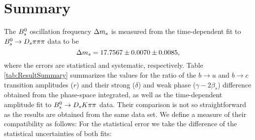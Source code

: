 \section{Summary}
\label{sec:Summary}


The ${{B}^0_{s}}$ oscillation frequency ${\Delta m_{{s}}}$ is measured from the time-dependent fit to ${{B}^0_{s}}\rightarrow{\ensuremath{{D}_{s}}}{\ensuremath{\pi}}{\ensuremath{\pi}}{\ensuremath{\pi}}$ data to be
\begin{equation*}
{\ensuremath{\Delta m_{{s}}}} = 17.7567 \pm 0.0070 \pm 0.0085,  
\end{equation*}
where the errors are statistical and systematic, respectively.
Table \ref{tab:ResultSummary} summarizes the values for the ratio of the $b\to u$ and $b\to c$ transition amplitudes ($r$)
and their strong ($\delta$) and weak phase ($\gamma -2 \beta_s$) difference 
obtained from the phase-space integrated, as well as the time-dependent amplitude fit to ${{B}^0_{s}}\rightarrow{\ensuremath{{D}_{s}}}{\ensuremath{K}}{\ensuremath{\pi}}{\ensuremath{\pi}}$ data.
%
Their comparison is not so straightforward as the results are obtained from the same data set. 
We define a measure of their compatibility as follows:
For the statistical error we take the difference of the statistical uncertainties of both fits:
